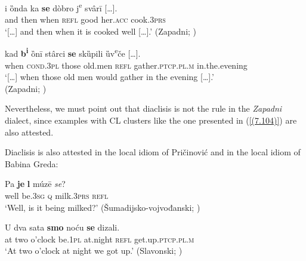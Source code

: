 \begin{exe}\ex\label{(7.102)}
\gll [\dots] i	ȍnda 	ka 	\textbf{se} 	dòbro j\textsuperscript{e} 	{svârī [\dots].}  \\
{} and	then	when	\textsc{refl} 	good	her.\textsc{acc} 	cook.3\textsc{prs} \\
\glt ‘[\dots] and then when it is cooked well [\dots].’
\hfill  (Zapadni; \citealt[285]{Curkovic14})

\ex\label{(7.103)}
\gll [\dots] kad 	\textbf{b\textsuperscript{i}} 	ȍnī 	stârci 	\textbf{se} 	skȕpili 	{ȕv\textsuperscript{e}če [\dots].} \\
{} when	\textsc{cond.3pl} 	those	old.men	\textsc{refl} 	gather.\textsc{ptcp.pl.m} in.the.evening \\
\glt ‘[\dots] when those old men would gather in the evening [\dots].’ \\
\hfill  (Zapadni; \citealt[320]{Curkovic14})
\end{exe}

\noindent Nevertheless, we must point out that diaclisis is not the rule in the \textit{Zapadni} dialect, since examples with CL clusters like the one presented in (\ref{(7.104)}) are also attested.


\noindent Diaclisis is also attested in the local idiom of Pričinović and in the local idiom of Babina Greda: 

\begin{exe}\ex\label{(7.105)}
\gll Pa 	\textbf{je} 	\textbf{l} 	múzē 	\textit{se}? \\
well	be.3\textsc{sg} 	\textsc{q} 	milk.3\textsc{prs} 	\textsc{refl}  \\
\glt ‘Well, is it being milked?’
\hfill  (Šumadijsko-vojvođanski; \citealt[279]{Nikolic66})

\ex\label{(7.106)}
\gll U 	dva 	sata 	\textbf{smo} 	noću 	\textbf{se} 	dizali. \\
at	two	o’clock	be.1\textsc{pl} 	at.night	\textsc{refl} 	get.up.\textsc{ptcp.pl.m} \\
\glt ‘At two o’clock at night we got up.’
\hfill  (Slavonski; \citealt[149]{FarkasBabic11})
\end{exe}

